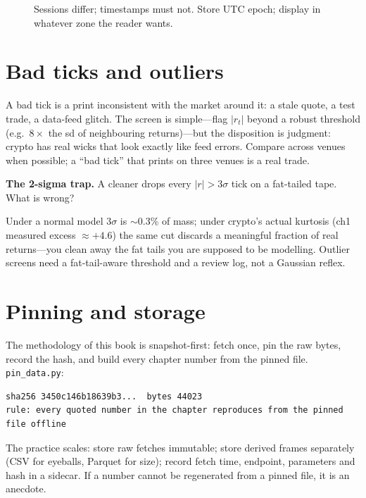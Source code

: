 \begin{figure}[htbp]\centering

\caption{Sessions differ; timestamps must not. Store UTC epoch; display in whatever zone the
reader wants.}
\label{fig:tz}
\end{figure}

\section{Bad ticks and outliers}\label{sec:outliers}

A bad tick is a print inconsistent with the market around it: a stale quote, a test trade, a
data-feed glitch. The screen is simple---flag $|r_t|$ beyond a robust threshold (e.g.\
$8\times$ the sd of neighbouring returns)---but the disposition is judgment: crypto has real
wicks that look exactly like feed errors. Compare across venues when possible; a ``bad tick''
that prints on three venues is a real trade.

\begin{example}\label{ex:outlier}
\textbf{The 2-sigma trap.} A cleaner drops every $|r|>3\sigma$ tick on a fat-tailed tape.
What is wrong?
\begin{solution}
Under a normal model $3\sigma$ is $\sim$0.3\% of mass; under crypto's actual kurtosis
(ch1 measured excess $\approx+4.6$) the same cut discards a meaningful fraction of real
returns---you clean away the fat tails you are supposed to be modelling. Outlier screens need
a fat-tail-aware threshold and a review log, not a Gaussian reflex.
\end{solution}
\end{example}

\section{Pinning and storage}\label{sec:pin}

The methodology of this book is snapshot-first: fetch once, pin the raw bytes, record the
hash, and build every chapter number from the pinned file. \texttt{pin\_data.py}:
\begin{lstlisting}[numbers=none]
sha256 3450c146b18639b3...  bytes 44023
rule: every quoted number in the chapter reproduces from the pinned file offline
\end{lstlisting}
The practice scales: store raw fetches immutable; store derived frames separately (CSV for
eyeballs, Parquet for size); record fetch time, endpoint, parameters and hash in a sidecar.
If a number cannot be regenerated from a pinned file, it is an anecdote.

